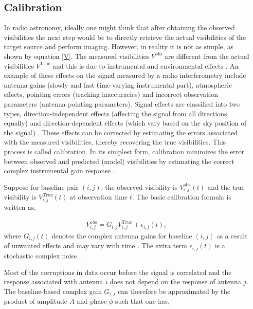 \subsection{Calibration}
\label{Calib}
In radio astronomy, ideally one might think that after obtaining the observed visibilities the next step would be to directly retrieve the actual visibilities of the target source and perform imaging. However, in reality it is not as simple, as shown by equation \ref{V}. The measured visibilities $V^{\mathrm{obs}}$ are different from the actual visibilities $V^{\mathrm{True}}$ and this is due to instrumental and environmental effects \citep{thompson2017interferometry}. An example of these effects on the signal measured by a radio interferometry include antenna gains (slowly and fast time-varying instrumental part), atmospheric effects, pointing errors (tracking inaccuracies) and incorrect observation parameters (antenna pointing parameters). Signal effects are classified into two types, direction-independent effects (affecting the signal from all directions equally) and direction-dependent effects (which vary based on the sky position of the signal) \citep{taylor1999synthesis}. These effects can be corrected by estimating the errors associated with the measured visibilities, thereby recovering the true visibilities. This process is called calibration. In its simplest form, calibration minimizes the error between observed and predicted (model) visibilities by estimating the correct complex instrumental gain response \citep{grobler2016calibration}. 

Suppose for baseline pair $(i,j)$, the observed visibility is $V^{\mathrm{obs}}_{i,j}(t)$ and the true visibility is $V^{\mathrm{True}}_{i,j}(t)$ at observation time $t$. The basic calibration formula is written as,

\begin{align}
V_{i,j}^{\mathrm{obs}}=G_{i,j} V_{i,j}^{\mathrm{True}} + \epsilon_{i,j}(t) ,
\end{align}
where $G_{i,j}(t)$ denotes the complex antenna gains for baseline $(i,j)$ as a result of unwanted effects and may vary with time \citep{thompson2001interferometry}. The extra term $ \epsilon_{i,j}(t)$ is a stochastic complex noise \citep{taylor1999synthesis}.

Most of the corruptions in data occur before the signal is correlated and the response associated with antenna  $i$  does not depend on the response of antenna $j$. The baseline-based complex gain $G_{i,j}$ can therefore be approximated by the product of amplitude $A$ and phase $\phi$ such that one has,  

